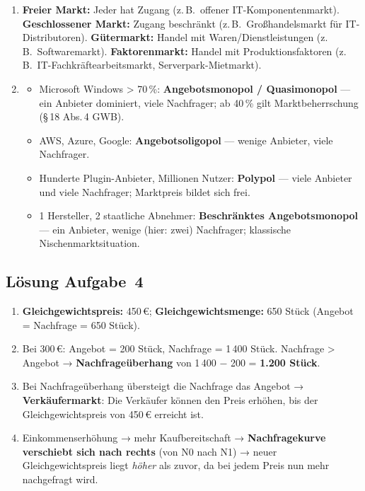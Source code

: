 \documentclass[11pt, a4paper]{article}
\begin{document}
\begin{enumerate}[label=(\alph*)]
  \item \textbf{Freier Markt:} Jeder hat Zugang (z.\,B.\ offener IT-Komponentenmarkt).
  \textbf{Geschlossener Markt:} Zugang beschränkt (z.\,B.\ Großhandelsmarkt für IT-Distributoren).
  \textbf{Gütermarkt:} Handel mit Waren/Dienstleistungen (z.\,B.\ Softwaremarkt).
  \textbf{Faktorenmarkt:} Handel mit Produktionsfaktoren (z.\,B.\ IT-Fachkräftearbeitsmarkt,
  Serverpark-Mietmarkt).

  \item
  \begin{itemize}
    \item Microsoft Windows > 70\,\%: \textbf{Angebotsmonopol / Quasimonopol} ---
    ein Anbieter dominiert, viele Nachfrager; ab 40\,\% gilt Marktbeherrschung (§\,18 Abs.\,4 GWB).
    \item AWS, Azure, Google: \textbf{Angebotsoligopol} --- wenige Anbieter, viele Nachfrager.
    \item Hunderte Plugin-Anbieter, Millionen Nutzer: \textbf{Polypol} --- viele Anbieter
    und viele Nachfrager; Marktpreis bildet sich frei.
    \item 1 Hersteller, 2 staatliche Abnehmer: \textbf{Beschränktes Angebotsmonopol} ---
    ein Anbieter, wenige (hier: zwei) Nachfrager; klassische Nischenmarktsituation.
  \end{itemize}
\end{enumerate}

\subsection*{Lösung Aufgabe~4}

\begin{enumerate}[label=(\alph*)]
  \item \textbf{Gleichgewichtspreis:} 450\,€; \textbf{Gleichgewichtsmenge:} 650 Stück
  (Angebot = Nachfrage = 650 Stück).

  \item Bei 300\,€: Angebot = 200 Stück, Nachfrage = 1\,400 Stück.
  Nachfrage > Angebot → \textbf{Nachfrageüberhang} von 1\,400 $-$ 200 = \textbf{1.200 Stück}.

  \item Bei Nachfrageüberhang übersteigt die Nachfrage das Angebot → \textbf{Verkäufermarkt}:
  Die Verkäufer können den Preis erhöhen, bis der Gleichgewichtspreis von 450\,€ erreicht ist.

  \item Einkommenserhöhung → mehr Kaufbereitschaft → \textbf{Nachfragekurve verschiebt sich nach
  rechts} (von N0 nach N1) → neuer Gleichgewichtspreis liegt \emph{höher} als zuvor,
  da bei jedem Preis nun mehr nachgefragt wird.
\end{enumerate}
\end{document}
